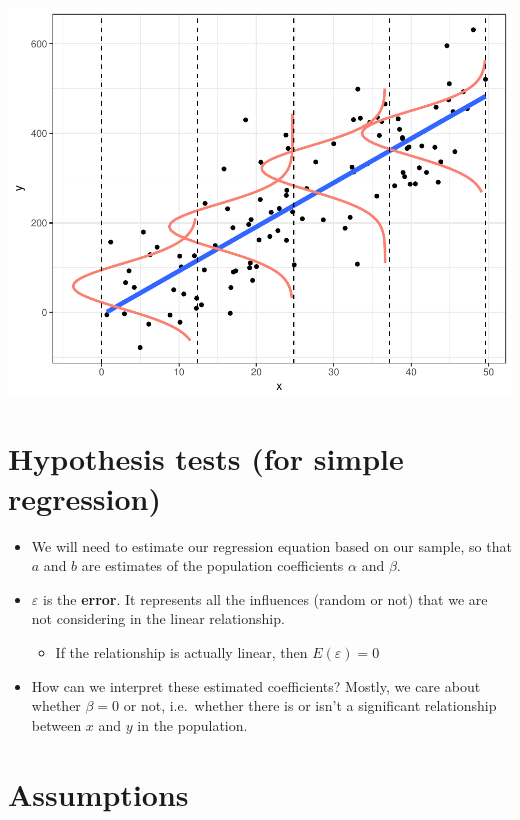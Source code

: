 \documentclass[]{article}
\providecommand{\tightlist}{%
  \setlength{\itemsep}{0pt}\setlength{\parskip}{0pt}}
\begin{document}
\includegraphics{Basics_of_Regression_files/figure-latex/unnamed-chunk-6-1.pdf}

\section{Hypothesis tests (for simple
regression)}\label{hypothesis-tests-for-simple-regression-1}

\begin{itemize}
\tightlist
\item
  We will need to estimate our regression equation based on our sample,
  so that \(a\) and \(b\) are estimates of the population coefficients
  \(\alpha\) and \(\beta\).
\item
  \(\varepsilon\) is the \textbf{error}. It represents all the
  influences (random or not) that we are not considering in the linear
  relationship.

  \begin{itemize}
  \tightlist
  \item
    If the relationship is actually linear, then \(E(\varepsilon) = 0\)
  \end{itemize}
\item
  How can we interpret these estimated coefficients? Mostly, we care
  about whether \(\beta = 0\) or not, i.e.~whether there is or isn't a
  significant relationship between \(x\) and \(y\) in the population.
\end{itemize}

\section{Assumptions}\label{assumptions}
\end{document}
